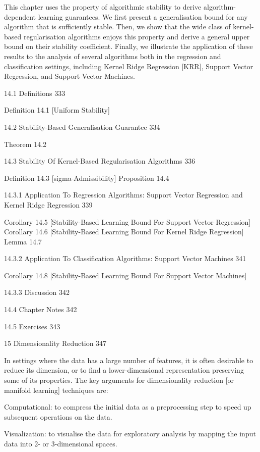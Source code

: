 This chapter uses the property of algorithmic stability to derive algorithm-dependent learning guarantees. We first present a generalisation bound for any algorithm that is sufficiently stable. Then, we show that the wide class of kernel-based regularisation algorithms enjoys this property and derive a general upper bound on their stability coefficient. Finally, we illustrate the application of these results to the analysis of several algorithms both in the regression and classification settings, including Kernel Ridge Regression [KRR], Support Vector Regression, and Support Vector Machines.

14.1 Definitions 333

Definition 14.1 [Uniform Stability]

14.2 Stability-Based Generalisation Guarantee 334

Theorem 14.2

14.3 Stability Of Kernel-Based Regularisation Algorithms 336

Definition 14.3 [sigma-Admissibility]
Proposition 14.4

14.3.1 Application To Regression Algorithms: Support Vector Regression and Kernel Ridge Regression 339

Corollary 14.5 [Stability-Based Learning Bound For Support Vector Regression]
Corollary 14.6 [Stability-Based Learning Bound For Kernel Ridge Regression]
Lemma 14.7

14.3.2 Application To Classification Algorithms: Support Vector Machines 341

Corollary 14.8 [Stability-Based Learning Bound For Support Vector Machines]

14.3.3 Discussion 342



14.4 Chapter Notes 342



14.5 Exercises 343



15 Dimensionality Reduction 347

In settings where the data has a large number of features, it is often desirable to reduce its dimension, or to find a lower-dimensional representation preserving some of its properties. The key arguments for dimensionality reduction [or manifold learning] techniques are:

Computational: to compress the initial data as a preprocessing step to speed up subsequent operations on the data.

Visualization: to visualise the data for exploratory analysis by mapping the input data into 2- or 3-dimensional spaces.

